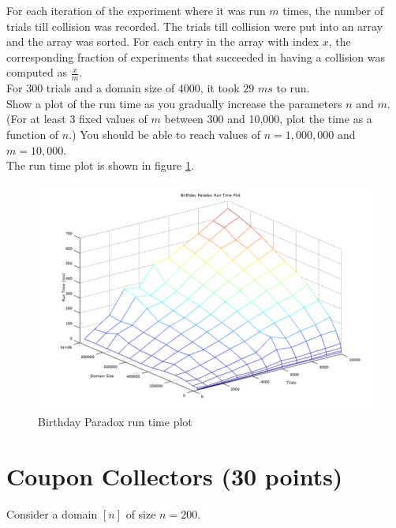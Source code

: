 \documentclass[11pt]{article}
\begin{document}
For each iteration of the experiment where it was run $m$ times, the number of trials till collision was recorded. The trials till collision were put into an array and the array was sorted. For each entry in the array with index $x$, the corresponding fraction of experiments that succeeded in having a collision was computed as $\frac{x}{m}$.\\

For $300$ trials and a domain size of $4000$, it took $29$ $ms$ to run.\\

Show a plot of the run time as you gradually increase the parameters $n$ and $m$.  
(For at least 3 fixed values of $m$ between 300 and 10,000, plot the time as a function of $n$.)
You should be able to reach values of $n = 1{,}000{,}000$ and $m = 10{,}000$.  \\

The run time plot is shown in figure \ref{bpruntimes}.

\begin{figure}[!htb]
\centering
\includegraphics[width=5.5in]{figures/bpruntimes.png}
\caption{Birthday Paradox run time plot}
\label{bpruntimes}
\end{figure}

\section{Coupon Collectors (30 points)}

Consider a domain $[n]$ of size $n = 200$.  
\end{document}
